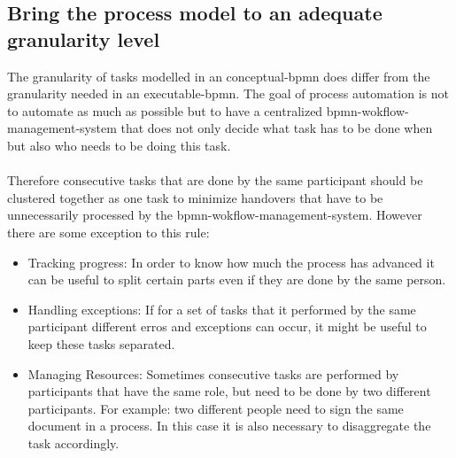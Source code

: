 \subsection{Bring the process model to an adequate granularity level}
The granularity of tasks modelled in an \gls{conceptual-bpmn} does differ from the granularity needed in an \gls{executable-bpmn}.
The goal of process automation is not to automate as much as possible but to have a centralized \gls{bpmn-wokflow-management-system} that does not only decide what task has to be done when but also who needs to be doing this task. \cite{freund2019real}
\\~\\Therefore consecutive tasks that are done by the same participant should be clustered together as one task to minimize handovers that have to be unnecessarily processed by the \gls{bpmn-wokflow-management-system}. \cite{fundamentals}
However there are some exception to this rule:
\begin{itemize}
	\item Tracking progress: In order to know how much the process has advanced it can be useful to split certain parts even if they are done by the same person. 
	\item Handling exceptions: If for a set of tasks that it performed by the same participant different erros and exceptions can occur, it might be useful to keep these tasks separated.
	\item Managing Resources: Sometimes consecutive tasks are performed by participants that have the same role, but need to be done by two different participants. For example: two different people need to sign the same document in a process.  In this case it is also necessary to disaggregate the task accordingly.
 \end{itemize}

